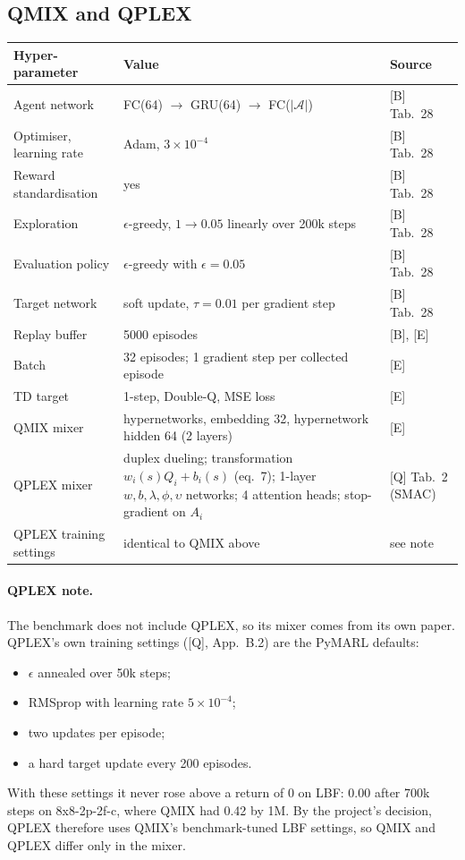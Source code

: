 \subsection{QMIX and QPLEX}

\begin{table}[H]
\centering\small
\begin{tabularx}{\textwidth}{l X l}
\toprule
Hyper-parameter & Value & Source \\
\midrule
Agent network & FC(64) $\to$ GRU(64) $\to$ FC($|\mathcal{A}|$) & [B] Tab.~28 \\
Optimiser, learning rate & Adam, $3\times10^{-4}$ & [B] Tab.~28 \\
Reward standardisation & yes & [B] Tab.~28 \\
Exploration & $\epsilon$-greedy, $1\to0.05$ linearly over 200k steps & [B] Tab.~28 \\
Evaluation policy & $\epsilon$-greedy with $\epsilon=0.05$ & [B] Tab.~28 \\
Target network & soft update, $\tau=0.01$ per gradient step & [B] Tab.~28 \\
Replay buffer & 5000 episodes & [B], [E] \\
Batch & 32 episodes; 1 gradient step per collected episode & [E] \\
TD target & 1-step, Double-Q, MSE loss & [E] \\
QMIX mixer & hypernetworks, embedding 32, hypernetwork hidden 64 (2 layers) & [E] \\
QPLEX mixer & duplex dueling; transformation $w_i(s)Q_i+b_i(s)$ (eq.~7); 1-layer $w,b,\lambda,\phi,\upsilon$ networks; 4 attention heads; stop-gradient on $A_i$ & [Q] Tab.~2 (SMAC) \\
QPLEX training settings & identical to QMIX above & see note \\
\bottomrule
\end{tabularx}
\end{table}

\paragraph{QPLEX note.} The benchmark does not include QPLEX, so its mixer comes from its own paper.
QPLEX's own training settings ([Q], App.~B.2) are the PyMARL defaults:
\begin{itemize}
  \item $\epsilon$ annealed over 50k steps;
  \item RMSprop with learning rate $5\times10^{-4}$;
  \item two updates per episode;
  \item a hard target update every 200 episodes.
\end{itemize}
With these settings it never rose above a return of 0 on LBF: 0.00 after 700k steps on
8x8-2p-2f-c, where QMIX had 0.42 by 1M. By the project's decision, QPLEX therefore uses QMIX's
benchmark-tuned LBF settings, so QMIX and QPLEX differ only in the mixer.

